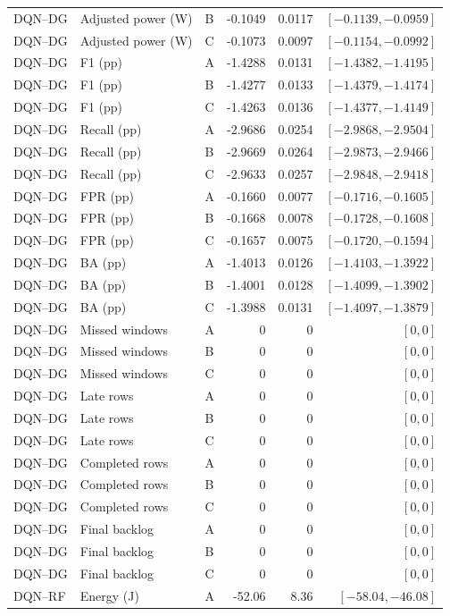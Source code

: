 \begin{longtable}{lllrrr}
DQN--DG & Adjusted power (W) & B & -0.1049 & 0.0117 & $[-0.1139,-0.0959]$\\
DQN--DG & Adjusted power (W) & C & -0.1073 & 0.0097 & $[-0.1154,-0.0992]$\\
DQN--DG & F1 (pp) & A & -1.4288 & 0.0131 & $[-1.4382,-1.4195]$\\
DQN--DG & F1 (pp) & B & -1.4277 & 0.0133 & $[-1.4379,-1.4174]$\\
DQN--DG & F1 (pp) & C & -1.4263 & 0.0136 & $[-1.4377,-1.4149]$\\
DQN--DG & Recall (pp) & A & -2.9686 & 0.0254 & $[-2.9868,-2.9504]$\\
DQN--DG & Recall (pp) & B & -2.9669 & 0.0264 & $[-2.9873,-2.9466]$\\
DQN--DG & Recall (pp) & C & -2.9633 & 0.0257 & $[-2.9848,-2.9418]$\\
DQN--DG & FPR (pp) & A & -0.1660 & 0.0077 & $[-0.1716,-0.1605]$\\
DQN--DG & FPR (pp) & B & -0.1668 & 0.0078 & $[-0.1728,-0.1608]$\\
DQN--DG & FPR (pp) & C & -0.1657 & 0.0075 & $[-0.1720,-0.1594]$\\
DQN--DG & BA (pp) & A & -1.4013 & 0.0126 & $[-1.4103,-1.3922]$\\
DQN--DG & BA (pp) & B & -1.4001 & 0.0128 & $[-1.4099,-1.3902]$\\
DQN--DG & BA (pp) & C & -1.3988 & 0.0131 & $[-1.4097,-1.3879]$\\
DQN--DG & Missed windows & A & 0 & 0 & $[0,0]$\\
DQN--DG & Missed windows & B & 0 & 0 & $[0,0]$\\
DQN--DG & Missed windows & C & 0 & 0 & $[0,0]$\\
DQN--DG & Late rows & A & 0 & 0 & $[0,0]$\\
DQN--DG & Late rows & B & 0 & 0 & $[0,0]$\\
DQN--DG & Late rows & C & 0 & 0 & $[0,0]$\\
DQN--DG & Completed rows & A & 0 & 0 & $[0,0]$\\
DQN--DG & Completed rows & B & 0 & 0 & $[0,0]$\\
DQN--DG & Completed rows & C & 0 & 0 & $[0,0]$\\
DQN--DG & Final backlog & A & 0 & 0 & $[0,0]$\\
DQN--DG & Final backlog & B & 0 & 0 & $[0,0]$\\
DQN--DG & Final backlog & C & 0 & 0 & $[0,0]$\\
DQN--RF & Energy (J) & A & -52.06 & 8.36 & $[-58.04,-46.08]$\\

\end{longtable}
